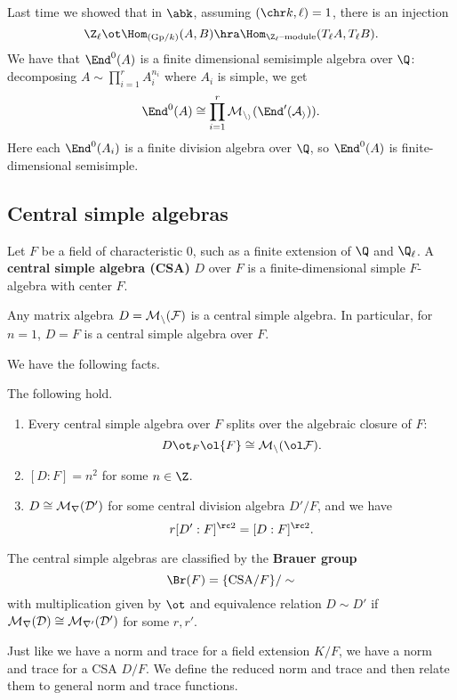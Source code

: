 
Last time we showed that in $\abk$, assuming $(\chr k, \ell)=1$, there is an injection
\[
\Z_{\ell}\ot \Hom_{(\text{Gp}/k)}(A,B)\hra \Hom_{\Z_{\ell}\text{--module}} (T_{\ell}A,T_{\ell}B).
\]
 We have that $\End^0(A)$ is a finite dimensional semisimple algebra over $\Q$: decomposing $A\sim \prod_{i=1}^r A_i^{n_i}$ where $A_i$ is simple, we get
\[
\End^0(A)\cong \prod_{i=1}^r  \cal M_{n_i} (\End^0(A_i)).
\]
Here each $\End^0(A_i)$ is a finite division algebra over $\Q$, so $\End^0(A)$ is finite-dimensional semisimple.

\subsection{Central simple algebras}
\begin{df}
Let $F$ be a field of characteristic 0, such as a finite extension of $\Q$ and $\Q_{\ell}$. 
A \textbf{central simple algebra (CSA)} $D$ over $F$  is a finite-dimensional simple $F$-algebra with center $F$.
\end{df}
\begin{ex}
Any matrix algebra $D=\cal M_n(F)$ is a central simple algebra.
In particular, for $n=1$, $D=F$ is a central simple algebra over $F$.
\end{ex}
We have the following facts.
\begin{pr}
The following hold.
\begin{enumerate}
\item
Every central simple algebra over $F$ splits over the algebraic closure of $F$:
\[
D\ot_F\ol{F} \cong \cal M_n(\ol F).
\]
\item
$[D:F]=n^2$ for some $n\in \Z$.
\item
$D\cong \cal M_r(D')$ for some central division algebra $D'/F$, and we have
\[
r[D':F]^{\rc 2}=[D:F]^{\rc 2}.
\]
\end{enumerate}
The central simple algebras are classified by the \textbf{Brauer group}
\[
\Br(F)=\{\text{CSA}/F\}/\sim
\]
with multiplication given by $\ot$ and equivalence relation $D\sim D'$ if $\cal M_r(D)\cong \cal M_{r'} (D')$ for some $r,r'$.
\end{pr}
Just like we have a norm and trace for a field extension $K/F$, we have a norm and trace for a CSA $D/F$. We define the reduced norm and trace and then relate them to general norm and trace functions.

